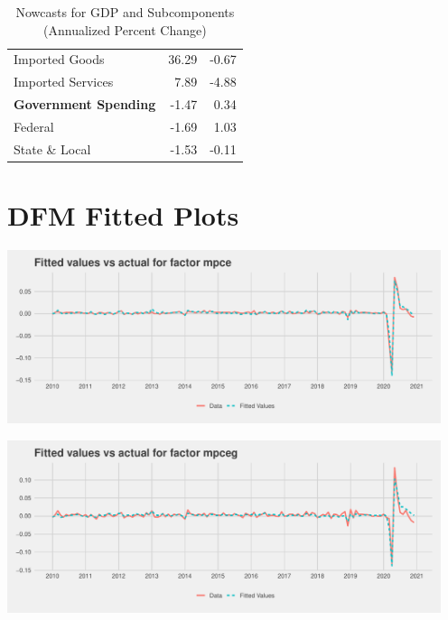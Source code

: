 \documentclass[11pt, letterpaper]{article}\usepackage[]{graphicx}\usepackage[]{color}
\begin{document}
\begin{table}[H]
\begin{tabular}{lrr}
  \hspace{8mm}  Imported Goods & 36.29 & -0.67 \\ 
  \hspace{8mm}  Imported Services & 7.89 & -4.88 \\ 
  \hspace{0mm} \textbf{Government Spending} & -1.47 & 0.34 \\ 
  \hspace{8mm}  Federal & -1.69 & 1.03 \\ 
  \hspace{8mm}  State \& Local & -1.53 & -0.11 \\ 
   \hline
\end{tabular}
\endgroup
\caption{Nowcasts for GDP and Subcomponents (Annualized Percent Change)} 
\end{table}





\appendix
\appendixpage
\addappheadtotoc

\section{DFM Fitted Plots}


{\centering \includegraphics[width=5in,height=2in]{figure/unnamed-chunk-20-1} 

}




{\centering \includegraphics[width=5in,height=2in]{figure/unnamed-chunk-20-2} 

}
\end{document}
